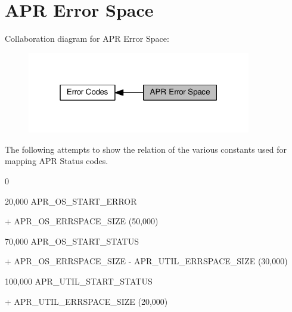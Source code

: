\hypertarget{group__APR__ERROR__map}{}\section{A\+PR Error Space}
\label{group__APR__ERROR__map}
Collaboration diagram for A\+PR Error Space\+:
\nopagebreak
\begin{figure}[H]
\begin{center}
\leavevmode
\includegraphics[width=277pt]{group__APR__ERROR__map}
\end{center}
\end{figure}

\begin{DoxyPre}
The following attempts to show the relation of the various constants
used for mapping APR Status codes.
\begin{DoxyVerb}  0
\end{DoxyVerb}
\end{DoxyPre}



\begin{DoxyPre} 20,000     APR\_OS\_START\_ERROR
\begin{DoxyVerb}   + APR_OS_ERRSPACE_SIZE (50,000)
\end{DoxyVerb}
\end{DoxyPre}



\begin{DoxyPre} 70,000      APR\_OS\_START\_STATUS
\begin{DoxyVerb}   + APR_OS_ERRSPACE_SIZE - APR_UTIL_ERRSPACE_SIZE (30,000)
\end{DoxyVerb}
\end{DoxyPre}



\begin{DoxyPre}100,000      APR\_UTIL\_START\_STATUS
\begin{DoxyVerb}    + APR_UTIL_ERRSPACE_SIZE (20,000)
\end{DoxyVerb}
\end{DoxyPre}



